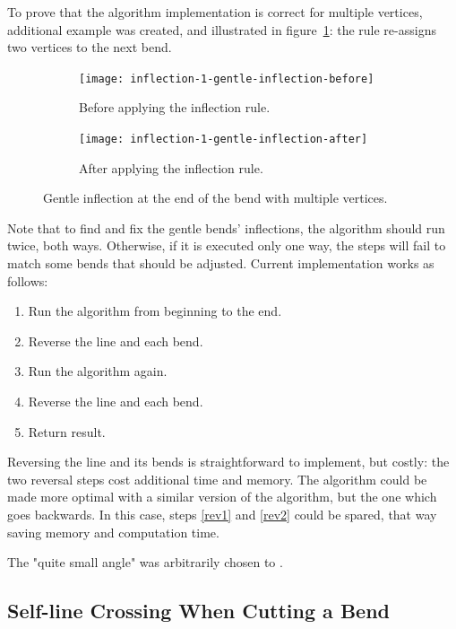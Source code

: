 \documentclass[a4paper]{article}
\begin{document}
To prove that the algorithm implementation is correct for multiple vertices,
additional example was created, and illustrated in
figure~\ref{fig:inflection-1-gentle-inflection}: the rule re-assigns two
vertices to the next bend.

\begin{figure}[ht]
    \centering
    \begin{subfigure}[b]{.49\textwidth}
        \texttt{[image: inflection-1-gentle-inflection-before]}
        \caption{Before applying the inflection rule.}
    \end{subfigure}
    \hfill
    \begin{subfigure}[b]{.49\textwidth}
        \texttt{[image: inflection-1-gentle-inflection-after]}
        \caption{After applying the inflection rule.}
    \end{subfigure}
    \caption{Gentle inflection at the end of the bend with multiple vertices.}
    \label{fig:inflection-1-gentle-inflection}
\end{figure}

Note that to find and fix the gentle bends' inflections, the algorithm should
run twice, both ways. Otherwise, if it is executed only one way, the steps will
fail to match some bends that should be adjusted. Current implementation works
as follows:

\begin{enumerate}
    \item Run the algorithm from beginning to the end.
    \item \label{rev1} Reverse the line and each bend.
    \item Run the algorithm again.
    \item \label{rev2} Reverse the line and each bend.
    \item Return result.
\end{enumerate}

Reversing the line and its bends is straightforward to implement, but costly:
the two reversal steps cost additional time and memory. The algorithm could be
made more optimal with a similar version of the algorithm, but the one which
goes backwards. In this case, steps \ref{rev1} and \ref{rev2} could be spared,
that way saving memory and computation time.

The "quite small angle" was arbitrarily chosen to \smallAngle.

\subsection{Self-line Crossing When Cutting a Bend}
\end{document}

